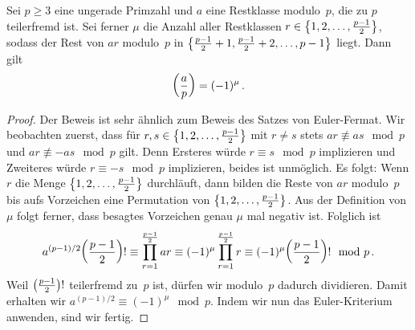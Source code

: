 \begin{satzmitnamen}
	Sei $p\geqslant 3$ eine ungerade Primzahl und $a$ eine Restklasse modulo~$p$, die zu $p$ teilerfremd ist. Sei ferner $\mu$ die Anzahl aller Restklassen $r\in\braces[\big]{1,2,\dotsc,\frac{p-1}2}$, sodass der Rest von $ar$ modulo~$p$ in $\braces[\big]{\frac{p-1}{2}+1,\frac{p-1}{2}+2,\dotsc,p-1}$ liegt. Dann gilt
	\begin{equation*}
		\parens*{\frac{a}{p}}=(-1)^\mu\,.
	\end{equation*}
\end{satzmitnamen}
\begin{proof}
	Der Beweis ist sehr ähnlich zum Beweis des Satzes von Euler-Fermat. Wir beobachten zuerst, dass für $r,s\in \braces[\big]{1,2,\dotsc,\frac{p-1}2}$ mit $r\neq s$ stets $ar\not\equiv as\mod p$ und $ar\not\equiv -as\mod p$ gilt. Denn Ersteres würde $r\equiv s\mod p$ implizieren und Zweiteres würde $r\equiv -s\mod p$ implizieren, beides ist unmöglich. Es folgt: Wenn $r$ die Menge $\braces[\big]{1,2,\dotsc,\frac{p-1}2}$ durchläuft, dann bilden die Reste von $ar$ modulo~$p$ bis aufs Vorzeichen eine Permutation von $\braces[\big]{1,2,\dotsc,\frac{p-1}2}$. Aus der Definition von $\mu$ folgt ferner, dass besagtes Vorzeichen genau $\mu$ mal negativ ist. Folglich ist
	\begin{equation*}
		a^{(p-1)/2}\parens*{\frac{p-1}{2}}!\equiv \prod_{r=1}^{\frac{p-1}{2}}ar\equiv (-1)^\mu\prod_{r=1}^{\frac{p-1}{2}}r\equiv (-1)^\mu\parens*{\frac{p-1}{2}}!\mod p\,. 
	\end{equation*}
	Weil $\parens[\big]{\frac{p-1}{2}}!$ teilerfremd zu~$p$ ist, dürfen wir modulo~$p$ dadurch dividieren. Damit erhalten wir $a^{(p-1)/2}\equiv (-1)^\mu\mod p$. Indem wir nun das Euler-Kriterium anwenden, sind wir fertig.
\end{proof}


